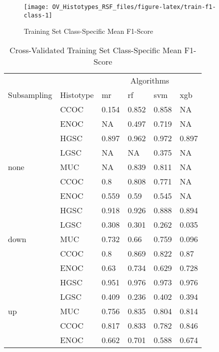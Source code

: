 \documentclass[
]{report}
\begin{document}
\begin{figure}[H]

{\centering \texttt{[image: OV\_Histotypes\_RSF\_files/figure-latex/train-f1-class-1]} 

}

\caption{Training Set Class-Specific Mean F1-Score}\label{fig:train-f1-class}
\end{figure}

\begin{table}

\caption{\label{tab:train-f1-class-table}Cross-Validated Training Set Class-Specific Mean F1-Score}
\centering
\begin{tabular}[t]{l|l|l|l|l|l}
\hline
\multicolumn{2}{c|}{ } & \multicolumn{4}{c}{Algorithms} \\
\cline{3-6}
Subsampling & Histotype & mr & rf & svm & xgb\\
\hline
 & CCOC & 0.154 & 0.852 & 0.858 & NA\\
\cline{2-6}
 & ENOC & NA & 0.497 & 0.719 & NA\\
\cline{2-6}
 & HGSC & 0.897 & 0.962 & 0.972 & 0.897\\
\cline{2-6}
 & LGSC & NA & NA & 0.375 & NA\\
\cline{2-6}
\multirow{-5}{*}{\raggedright\arraybackslash none} & MUC & NA & 0.839 & 0.811 & NA\\
\cline{1-6}
 & CCOC & 0.8 & 0.808 & 0.771 & NA\\
\cline{2-6}
 & ENOC & 0.559 & 0.59 & 0.545 & NA\\
\cline{2-6}
 & HGSC & 0.918 & 0.926 & 0.888 & 0.894\\
\cline{2-6}
 & LGSC & 0.308 & 0.301 & 0.262 & 0.035\\
\cline{2-6}
\multirow{-5}{*}{\raggedright\arraybackslash down} & MUC & 0.732 & 0.66 & 0.759 & 0.096\\
\cline{1-6}
 & CCOC & 0.8 & 0.869 & 0.822 & 0.87\\
\cline{2-6}
 & ENOC & 0.63 & 0.734 & 0.629 & 0.728\\
\cline{2-6}
 & HGSC & 0.951 & 0.976 & 0.973 & 0.976\\
\cline{2-6}
 & LGSC & 0.409 & 0.236 & 0.402 & 0.394\\
\cline{2-6}
\multirow{-5}{*}{\raggedright\arraybackslash up} & MUC & 0.756 & 0.835 & 0.804 & 0.814\\
\cline{1-6}
 & CCOC & 0.817 & 0.833 & 0.782 & 0.846\\
\cline{2-6}
 & ENOC & 0.662 & 0.701 & 0.588 & 0.674\\

\end{tabular}
\end{table}
\end{document}
